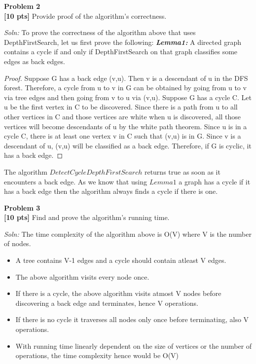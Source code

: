 \documentclass{article}
\newenvironment{problem}[2][Problem]
    { \begin{mdframed}[backgroundcolor=gray!20] \textbf{#1 #2} \\}
    {  \end{mdframed}}
\newenvironment{solution}
    {\textit{Soln:}}
    {}
\begin{document}
\begin{problem}{2}
\textbf{[10 pts]} Provide proof of the algorithm's correctness. 
\end{problem}
\begin{solution}
To prove the correctness of the algorithm above that uses DepthFirstSearch, let us first prove the following:
\newline \textbf{\textit{Lemma1:}} A directed graph contains a cycle if and only if DepthFirstSearch on that graph classifies some edges as back edges.
\begin{proof}
Suppose G has a back edge (v,u).
Then v is a descendant of u in the DFS forest.
Therefore, a cycle from u to v in G can be obtained by going from u to v via tree edges and then going from v to u via (v,u).
Suppose G has a cycle C.
Let u be the first vertex in C to be discovered.
Since there is a path from u to all other vertices in C and those vertices are white when u is discovered, all those vertices will become descendants of u by the white path theorem.
Since u is in a cycle C, there is at least one vertex v in C such that (v,u) is in G.
Since v is a descendant of u, (v,u) will be classified as a back edge. Therefore, if G is cyclic, it has a back edge.\end{proof}
\begin{center}
The algorithm $Detect Cycle Depth First Search$ returns true as soon as it encounters a back edge. As we know that using $Lemma 1$ a graph has a cycle if it has a back edge then the algorithm always finds a cycle if there is one.
\end{center}
\end{solution}

\begin{problem}{3}
\textbf{[10 pts]} Find and prove the algorithm's running time.
\end{problem}
\begin{solution}
The time complexity of the algorithm above is O(V) where V is the number of nodes.
\begin{itemize}
\item A tree contains V-1 edges and a cycle should contain atleast V edges. \item The above algorithm visits every node once.
\item If there is a cycle, the above algorithm visits atmost V nodes before discovering a back edge and terminates, hence V operations.
\item If there is no cycle it traverses all nodes only once before terminating, also V operations.
\item With running time linearly dependent on the size of vertices or the number of operations, the time complexity hence would be O(V)
\end{itemize}
\end{solution}
\end{document}
